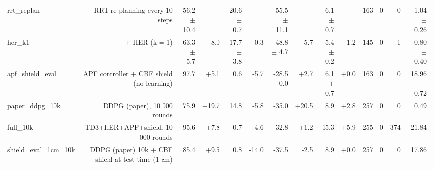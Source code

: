 \begin{table}[t]
\begin{tabular}{lrrrrrrrrrrrrr}
rrt\_replan & RRT re-planning every 10 steps & 56.2 $\pm$ 10.4 & -- & 20.6 $\pm$ 0.7 & -- & -55.5 $\pm$ 11.1 & -- & 6.1 $\pm$ 0.7 & -- & 163 & 0 & 0 & 1.04 $\pm$ 0.26 \\
her\_k1 & + HER (k = 1) & 63.3 $\pm$ 5.7 & -8.0 & 17.7 $\pm$ 3.8 & +0.3 & -48.8 $\pm$ 4.7 & -5.7 & 5.4 $\pm$ 0.2 & -1.2 & 145 & 0 & 1 & 0.80 $\pm$ 0.40 \\
apf\_shield\_eval & APF controller + CBF shield (no learning) & 97.7 & +5.1 & 0.6 & -5.7 & -28.5 $\pm$ 0.0 & +2.7 & 6.1 $\pm$ 0.7 & +0.0 & 163 & 0 & 0 & 18.96 $\pm$ 0.72 \\
paper\_ddpg\_10k & DDPG (paper), 10 000 rounds & 75.9 & +19.7 & 14.8 & -5.8 & -35.0 & +20.5 & 8.9 & +2.8 & 257 & 0 & 0 & 0.49 \\
full\_10k & TD3+HER+APF+shield, 10 000 rounds & 95.6 & +7.8 & 0.7 & -4.6 & -32.8 & +1.2 & 15.3 & +5.9 & 255 & 0 & 374 & 21.84 \\
shield\_eval\_1cm\_10k & DDPG (paper) 10k + CBF shield at test time (1 cm) & 85.4 & +9.5 & 0.8 & -14.0 & -37.5 & -2.5 & 8.9 & +0.0 & 257 & 0 & 0 & 17.86 \\
\bottomrule
\end{tabular}
\end{table}